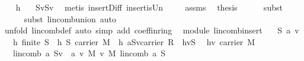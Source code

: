 \begin{isabellebody}
\ \ \isamarkupfalse%
\ h{}\ \isamarkupfalse%
\ {}{\isacharcolon}\ {\isachardoublequoteopen}S{\isacharequal}{\isacharbraceleft}v{\isacharbraceright}{\isasymunion}{\isacharparenleft}S{\isacharminus}{\isacharbraceleft}v{\isacharbraceright}{\isacharparenright}{\isachardoublequoteclose}\ \isamarkupfalse%
\ {\isacharparenleft}metis\ insert{\isacharunderscore}Diff\ insert{\isacharunderscore}is{\isacharunderscore}Un{\isacharparenright}\ \isanewline
\ \ \isamarkupfalse%
\ assms\ \isamarkupfalse%
\ {\isacharquery}thesis\isanewline
\ \ \ \ \isamarkupfalse%
\ {\isacharparenleft}subst\ {}{\isacharparenright}\isanewline
\ \ \ \ \isamarkupfalse%
\ {\isacharparenleft}subst\ lincomb{\isacharunderscore}union{\isacharcomma}\ auto{\isacharparenright}\isanewline
\ \ \ \ \isamarkupfalse%
\ {\isacharparenleft}unfold\ lincomb{\isacharunderscore}def{\isacharcomma}\ auto\ simp\ add{\isacharcolon}\ coeff{\isacharunderscore}in{\isacharunderscore}ring{\isacharparenright}\isanewline
{}\isamarkupfalse%
%
\endisatagproof
{\isafoldproof}%
%
\isadelimproof
\isanewline
%
\endisadelimproof
\isanewline
\isanewline
{}\isamarkupfalse%
\ {\isacharparenleft}\ module{\isacharparenright}\ lincomb{\isacharunderscore}insert{\isacharcolon}\isanewline
\ \ \ S\ a\ v\isanewline
\ \ \ h{}{\isacharcolon}\ {\isachardoublequoteopen}finite\ S{\isachardoublequoteclose}\ \ h{}{\isacharcolon}\ {\isachardoublequoteopen}S{\isasymsubseteq}\ carrier\ M{\isachardoublequoteclose}\ \ h{}{\isacharcolon}\ {\isachardoublequoteopen}a{\isasymin}{\isacharparenleft}S{\isasymunion}{\isacharbraceleft}v{\isacharbraceright}{\isasymrightarrow}carrier\ R{\isacharparenright}{\isachardoublequoteclose}\ \ h{}{\isacharcolon}{\isachardoublequoteopen}v{\isasymnotin}S{\isachardoublequoteclose}\ \ \isanewline
h{}{\isacharcolon}{\isachardoublequoteopen}v{\isasymin}\ carrier\ M{\isachardoublequoteclose}\ \ \isanewline
\ \ \ {\isachardoublequoteopen}lincomb\ a\ {\isacharparenleft}S{\isasymunion}{\isacharbraceleft}v{\isacharbraceright}{\isacharparenright}\ {\isacharequal}\ {\isacharparenleft}{\isacharparenleft}a\ v{\isacharparenright}\ {\isasymodot}\isactrlbsub M\isactrlesub \ v{\isacharparenright}\ {\isasymoplus}\isactrlbsub M\isactrlesub \ lincomb\ a\ S{\isachardoublequoteclose}\isanewline

\end{isabellebody}
